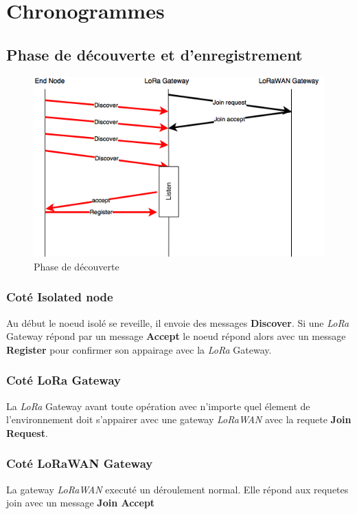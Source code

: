 \section{Chronogrammes}
\subsection{Phase de découverte et d'enregistrement}
\begin{figure}[!ht]
\centering
\includegraphics[scale=0.6]{Discovery.png} 
\caption{Phase de découverte}
\end{figure}
\subsubsection{Coté Isolated node}Au début le noeud isolé se reveille, il envoie des messages \textbf{Discover}. Si une \textit{LoRa} Gateway répond par un message \textbf{Accept} le noeud répond alors avec un message  \textbf{Register} pour confirmer son appairage avec la \textit{LoRa} Gateway.
\subsubsection{Coté LoRa Gateway}
La \textit{LoRa} Gateway avant toute opération avec n'importe quel élement de l'environnement doit s'appairer avec une gateway \textit{LoRaWAN} avec la requete  \textbf{Join Request}.
\subsubsection{Coté LoRaWAN Gateway}
La gateway \textit{LoRaWAN} executé un déroulement normal. Elle répond aux requetes join avec un message  \textbf{Join Accept}
\newpage
